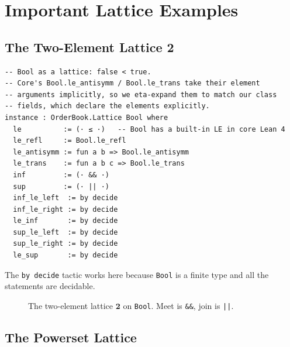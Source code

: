 \documentclass[12pt, a4paper, openright]{book}
\theoremstyle{thmstyle}
\theoremstyle{defstyle}
\newcommand{\lc}[1]{\texttt{#1}}
\begin{document}
\FloatBarrier
\section{Important Lattice Examples}

\subsection{The Two-Element Lattice $\mathbf{2}$}

\begin{verbatim}
-- Bool as a lattice: false < true.
-- Core's Bool.le_antisymm / Bool.le_trans take their element
-- arguments implicitly, so we eta-expand them to match our class
-- fields, which declare the elements explicitly.
instance : OrderBook.Lattice Bool where
  le          := (· ≤ ·)   -- Bool has a built-in LE in core Lean 4
  le_refl     := Bool.le_refl
  le_antisymm := fun a b => Bool.le_antisymm
  le_trans    := fun a b c => Bool.le_trans
  inf         := (· && ·)
  sup         := (· || ·)
  inf_le_left  := by decide
  inf_le_right := by decide
  le_inf       := by decide
  sup_le_left  := by decide
  sup_le_right := by decide
  le_sup       := by decide
\end{verbatim}

\noindent The \lc{by decide} tactic works here because \lc{Bool} is a finite
type and all the statements are decidable.

\begin{figure}[H]
  \centering
  \caption{The two-element lattice $\mathbf{2}$ on \texttt{Bool}.
           Meet is \texttt{\&\&}, join is \texttt{||}.}
\end{figure}

\subsection{The Powerset Lattice}
\end{document}
